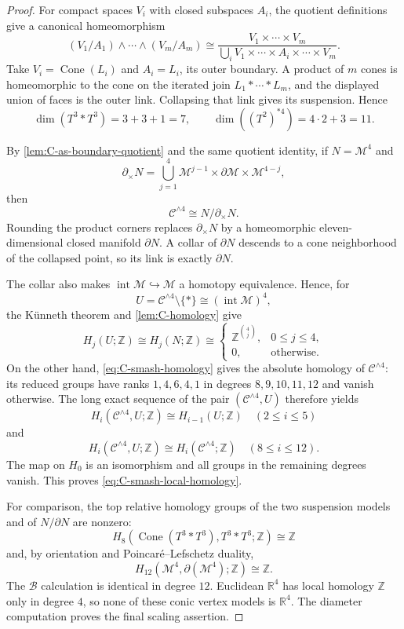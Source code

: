 \documentclass[11pt,letterpaper]{article}
\numberwithin{equation}{section}
\theoremstyle{definition}
\theoremstyle{remark}
\newcommand{\R}{\mathbb R}
\newcommand{\Z}{\mathbb Z}
\newcommand{\Cone}{\operatorname{Cone}}
\begin{document}
\begin{proof}
For compact spaces \(V_i\) with closed subspaces \(A_i\), the quotient
definitions give a canonical homeomorphism
\[
 (V_1/A_1)\wedge\cdots\wedge(V_m/A_m)
 \cong
 \frac{V_1\times\cdots\times V_m}
 {\bigcup_iV_1\times\cdots\times A_i\times\cdots\times V_m}.
\]
Take \(V_i=\Cone(L_i)\) and \(A_i=L_i\), its outer boundary.  A product
of \(m\) cones is homeomorphic to the cone on the iterated join
\(L_1*\cdots*L_m\), and the displayed union of faces is the outer link.
Collapsing that link gives its suspension.  Hence
\[
 \dim(T^3*T^3)=3+3+1=7,\qquad
 \dim((T^2)^{*4})=4\cdot2+3=11.
\]

By \cref{lem:C-as-boundary-quotient} and the same quotient identity, if
\(N=\mathcal M^4\) and
\[
 \partial_\times N
 =\bigcup_{j=1}^4
   \mathcal M^{j-1}\times\partial\mathcal M
   \times\mathcal M^{4-j},
\]
then
\[
 \mathcal C^{\wedge4}\cong N/\partial_\times N.
\]
Rounding the product corners replaces \(\partial_\times N\) by a
homeomorphic eleven-dimensional closed manifold \(\partial N\).  A collar
of \(\partial N\) descends to a cone neighborhood of the collapsed point,
so its link is exactly \(\partial N\).

The collar also makes
\(\operatorname{int}\mathcal M\hookrightarrow\mathcal M\) a homotopy
equivalence.  Hence, for
\[
 U=\mathcal C^{\wedge4}\setminus\{*\}
 \cong(\operatorname{int}\mathcal M)^4,
\]
the K\"unneth theorem and \cref{lem:C-homology} give
\[
 H_j(U;\Z)\cong H_j(N;\Z)\cong
 \begin{cases}
  \Z^{\binom4j},&0\leq j\leq4,\\
  0,&\text{otherwise}.
 \end{cases}
\]
On the other hand, \cref{eq:C-smash-homology} gives the absolute homology
of \(\mathcal C^{\wedge4}\): its reduced groups have ranks
\(1,4,6,4,1\) in degrees \(8,9,10,11,12\) and vanish otherwise.  The long
exact sequence of the pair
\((\mathcal C^{\wedge4},U)\) therefore yields
\[
 H_i(\mathcal C^{\wedge4},U;\Z)
 \cong H_{i-1}(U;\Z)\quad(2\leq i\leq5)
\]
and
\[
 H_i(\mathcal C^{\wedge4},U;\Z)
 \cong H_i(\mathcal C^{\wedge4};\Z)\quad(8\leq i\leq12).
\]
The map on \(H_0\) is an isomorphism and all groups in the remaining
degrees vanish.  This proves \cref{eq:C-smash-local-homology}.

For comparison, the top relative homology groups of the two suspension
models and of \(N/\partial N\) are nonzero:
\[
 H_8(\Cone(T^3*T^3),T^3*T^3;\Z)\cong\Z
\]
and, by orientation and Poincar\'e--Lefschetz duality,
\[
 H_{12}(\mathcal M^4,\partial(\mathcal M^4);\Z)\cong\Z.
\]
The \(\mathcal B\) calculation is identical in degree \(12\).
Euclidean \(\R^4\) has local homology \(\Z\) only in degree \(4\), so
none of these conic vertex models is \(\R^4\).  The diameter computation
proves the final scaling assertion.
\end{proof}
\end{document}
